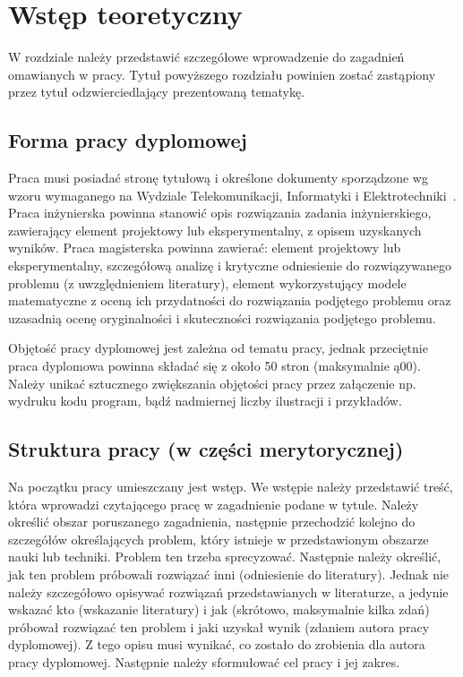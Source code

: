 \chapter{Wstęp teoretyczny}
\label{sec:chapter2}

W rozdziale należy przedstawić szczegółowe wprowadzenie do zagadnień omawianych w pracy. Tytuł powyższego rozdziału powinien zostać zastąpiony przez tytuł odzwierciedlający prezentowaną tematykę.

\section{Forma pracy dyplomowej}
\label{sec:ą:chapter2}
Praca musi posiadać stronę tytułową i określone dokumenty sporządzone wg wzoru
wymaganego na Wydziale Telekomunikacji, Informatyki i Elektrotechniki~\cite{wytyczne}. Praca
inżynierska powinna stanowić opis rozwiązania zadania inżynierskiego, zawierający element projektowy lub eksperymentalny, z opisem uzyskanych wyników. Praca magisterska powinna zawierać: element projektowy lub eksperymentalny,
szczegółową analizę i krytyczne odniesienie do rozwiązywanego problemu
(z uwzględnieniem literatury), element wykorzystujący modele matematyczne z oceną ich przydatności do rozwiązania podjętego problemu oraz uzasadnią ocenę
oryginalności i skuteczności rozwiązania podjętego problemu.

Objętość pracy dyplomowej jest zależna od tematu pracy, jednak przeciętnie praca dyplomowa powinna składać się z około 50 stron (maksymalnie ą00). Należy unikać sztucznego zwiększania objętości pracy przez załączenie np. wydruku kodu program, bądź nadmiernej liczby ilustracji i przykładów.




\section{Struktura pracy (w części merytorycznej)}
Na początku pracy umieszczany jest wstęp. We wstępie należy przedstawić treść,
która wprowadzi czytającego pracę w zagadnienie podane w tytule. Należy określić obszar poruszanego zagadnienia, następnie przechodzić kolejno do szczegółów określających problem, który istnieje w przedstawionym obszarze nauki lub techniki.
Problem ten trzeba sprecyzować. Następnie należy określić, jak ten problem próbowali rozwiązać inni (odniesienie do literatury). Jednak nie należy szczegółowo opisywać rozwiązań przedstawianych w literaturze, a jedynie wskazać kto (wskazanie literatury) i jak (skrótowo, maksymalnie kilka zdań) próbował rozwiązać ten problem i jaki uzyskał wynik (zdaniem autora pracy dyplomowej). Z tego opisu musi wynikać, co zostało do zrobienia dla  autora pracy dyplomowej. Następnie należy sformułować cel pracy i jej zakres.

